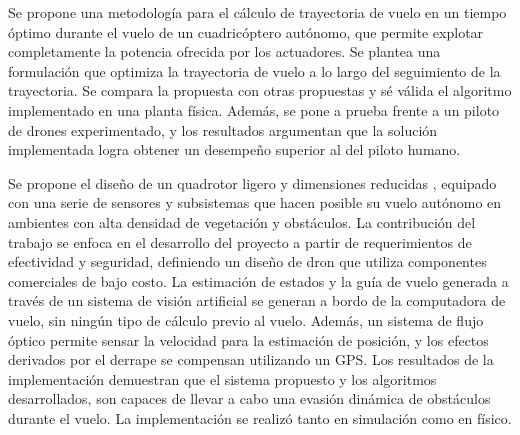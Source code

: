 Se propone una metodología \cite{foehn2021time} para el cálculo de trayectoria de vuelo en un tiempo óptimo durante el vuelo de un cuadricóptero autónomo, que permite explotar completamente la potencia ofrecida por los actuadores. Se plantea una formulación que optimiza la trayectoria de vuelo a lo largo del seguimiento de la trayectoria. Se compara la propuesta con otras propuestas y sé válida el algoritmo implementado en una planta física. Además, se pone a prueba frente a un piloto de drones experimentado, y los resultados argumentan que la solución implementada logra obtener un desempeño superior al del piloto humano.

Se propone el diseño de un quadrotor ligero y dimensiones reducidas \cite{stevens2021autonomous}, equipado con una serie de sensores y subsistemas que hacen posible su vuelo autónomo en ambientes con alta densidad de vegetación y obstáculos.  La contribución del trabajo se enfoca en el desarrollo del proyecto a partir de requerimientos de efectividad y seguridad, definiendo un diseño de dron que utiliza componentes comerciales de bajo costo. La estimación de estados y la guía de vuelo generada a través de un sistema de visión artificial se generan a bordo de la computadora de vuelo, sin ningún tipo de cálculo previo al vuelo. Además, un sistema de flujo óptico permite sensar la velocidad para la estimación de posición, y los efectos derivados por el derrape se compensan utilizando un GPS.
Los resultados de la implementación demuestran que el sistema propuesto y los algoritmos desarrollados, son capaces de llevar a cabo una evasión dinámica de obstáculos durante el vuelo. La implementación se realizó tanto en simulación como en físico. 
